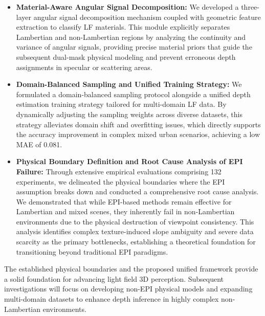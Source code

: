 \documentclass[lettersize,journal]{IEEEtran}
\begin{document}
\begin{itemize}
\item \textbf{Material-Aware Angular Signal Decomposition:} We developed a three-layer angular signal decomposition mechanism coupled with geometric feature extraction to classify LF materials. This module explicitly separates Lambertian and non-Lambertian regions by analyzing the continuity and variance of angular signals, providing precise material priors that guide the subsequent dual-mask physical modeling and prevent erroneous depth assignments in specular or scattering areas.
\item \textbf{Domain-Balanced Sampling and Unified Training Strategy:} We formulated a domain-balanced sampling protocol alongside a unified depth estimation training strategy tailored for multi-domain LF data. By dynamically adjusting the sampling weights across diverse datasets, this strategy alleviates domain shift and overfitting issues, which directly supports the accuracy improvement in complex mixed urban scenarios, achieving a low MAE of 0.081.
\item \textbf{Physical Boundary Definition and Root Cause Analysis of EPI Failure:} Through extensive empirical evaluations comprising 132 experiments, we delineated the physical boundaries where the EPI assumption breaks down and conducted a comprehensive root cause analysis. We demonstrated that while EPI-based methods remain effective for Lambertian and mixed scenes, they inherently fail in non-Lambertian environments due to the physical destruction of viewpoint consistency. This analysis identifies complex texture-induced slope ambiguity and severe data scarcity as the primary bottlenecks, establishing a theoretical foundation for transitioning beyond traditional EPI paradigms.
\end{itemize}

The established physical boundaries and the proposed unified framework provide a solid foundation for advancing light field 3D perception. Subsequent investigations will focus on developing non-EPI physical models and expanding multi-domain datasets to enhance depth inference in highly complex non-Lambertian environments.
\end{document}
